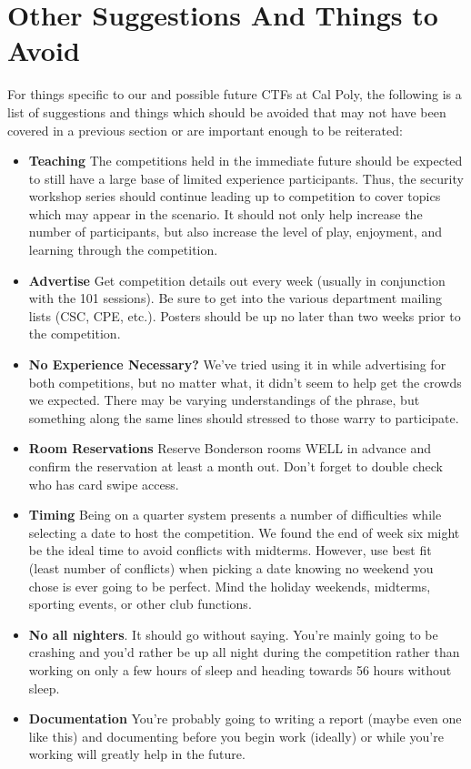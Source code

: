 \documentclass[10pt]{article}
\begin{document}
\section{Other Suggestions And Things to Avoid}
For things specific to our and possible future CTFs at Cal Poly, the following
is a list of suggestions and things which should be avoided that may not have
been covered in a previous section or are important enough to be reiterated:
\begin{itemize}
    \item \textbf{Teaching} The competitions held in the immediate future should
    be expected to still have a large base of limited experience participants.
    Thus, the security workshop series should continue leading up to competition
    to cover topics which may appear in the scenario. It should not only help
    increase the number of participants, but also increase the level of play,
    enjoyment, and learning through the competition.
    \item \textbf{Advertise} Get competition details out every week (usually in
    conjunction with the 101 sessions). Be sure to get into the various
    department mailing lists (CSC, CPE, etc.). Posters should be up no later
    than two weeks prior to the competition.
    \item \textbf{No Experience Necessary?} We've tried using it in while
    advertising for both competitions, but no matter what, it didn't seem to
    help get the crowds we expected. There may be varying understandings of the
    phrase, but something along the same lines should stressed to those warry
    to participate.
    \item \textbf{Room Reservations} Reserve Bonderson rooms WELL in advance and
    confirm the reservation at least a month out. Don't forget to double check
    who has card swipe access.
    \item \textbf{Timing} Being on a quarter system presents a number of
    difficulties while selecting a date to host the competition. We found the end
    of week six might be the ideal time to avoid conflicts with midterms.
    However, use best fit (least number of conflicts) when picking a date
    knowing no weekend you chose is ever going to be perfect. Mind the holiday
    weekends, midterms, sporting events, or other club functions.
    \item \textbf{No all nighters}. It should go without saying. You're mainly
    going to be crashing and you'd rather be up all night during the
    competition rather than working on only a few hours of sleep and heading
    towards 56 hours without sleep.
    \item \textbf{Documentation} You're probably going to writing a report
    (maybe even one like this) and documenting before you begin work (ideally)
    or while you're working will greatly help in the future.
\end{itemize}
\end{document}
